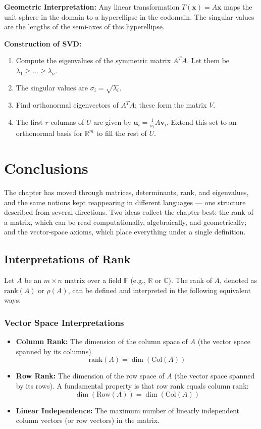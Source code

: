\textbf{Geometric Interpretation:}
Any linear transformation $T(\mathbf{x}) = A\mathbf{x}$ maps the unit sphere in the domain to a hyperellipse in the codomain. The singular values are the lengths of the semi-axes of this hyperellipse.

\textbf{Construction of SVD:}
\begin{enumerate}
    \item Compute the eigenvalues of the symmetric matrix $A^T A$. Let them be $\lambda_1 \ge \dots \ge \lambda_n$.
    \item The singular values are $\sigma_i = \sqrt{\lambda_i}$.
    \item Find orthonormal eigenvectors of $A^T A$; these form the matrix $V$.
    \item The first $r$ columns of $U$ are given by $\mathbf{u}_i = \frac{1}{\sigma_i} A \mathbf{v}_i$. Extend this set to an orthonormal basis for $\mathbb{R}^m$ to fill the rest of $U$.
\end{enumerate}

\section{Conclusions}

The chapter has moved through matrices, determinants, rank, and eigenvalues, and the same notions kept reappearing in different languages — one structure described from several directions. Two ideas collect the chapter best: the rank of a matrix, which can be read computationally, algebraically, and geometrically; and the vector-space axioms, which place everything under a single definition.

\subsection{Interpretations of Rank}

Let $A$ be an $m \times n$ matrix over a field $\mathbb{F}$ (e.g., $\mathbb{R}$ or $\mathbb{C}$). The rank of $A$, denoted as $\text{rank}(A)$ or $\rho(A)$, can be defined and interpreted in the following equivalent ways:

\subsubsection{Vector Space Interpretations}
\begin{itemize}
    \item \textbf{Column Rank:} The dimension of the column space of $A$ (the vector space spanned by its columns).
    \[ \text{rank}(A) = \dim(\text{Col}(A)) \]
    \item \textbf{Row Rank:} The dimension of the row space of $A$ (the vector space spanned by its rows). A fundamental property is that row rank equals column rank:
    \[ \dim(\text{Row}(A)) = \dim(\text{Col}(A)) \]
    \item \textbf{Linear Independence:} The maximum number of linearly independent column vectors (or row vectors) in the matrix.
\end{itemize}

